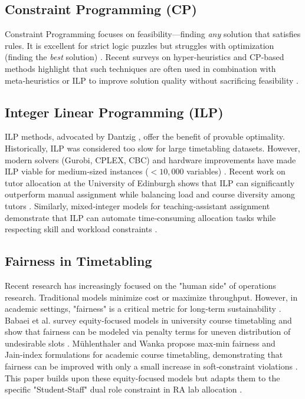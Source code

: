 \documentclass[journal,onecolumn]{IEEEtran}
\begin{document}
\subsection{Constraint Programming (CP)}
Constraint Programming focuses on feasibility—finding \textit{any} solution that satisfies rules. It is excellent for strict logic puzzles but struggles with optimization (finding the \textit{best} solution) \cite{rossi2006}. Recent surveys on hyper‑heuristics and CP‑based methods highlight that such techniques are often used in combination with meta‑heuristics or ILP to improve solution quality without sacrificing feasibility \cite{burke2010, or_human}.

\subsection{Integer Linear Programming (ILP)}
ILP methods, advocated by Dantzig \cite{dantzig}, offer the benefit of provable optimality. Historically, ILP was considered too slow for large timetabling datasets. However, modern solvers (Gurobi, CPLEX, CBC) and hardware improvements have made ILP viable for medium‑sized instances ($<10,000$ variables) \cite{cplex, gurobi, coinor}. Recent work on tutor allocation at the University of Edinburgh shows that ILP can significantly outperform manual assignment while balancing load and course diversity among tutors \cite{caselli2022, caselli2020}. Similarly, mixed‑integer models for teaching‑assistant assignment demonstrate that ILP can automate time‑consuming allocation tasks while respecting skill and workload constraints \cite{teaching_assistant_assignment, mixed_integer_tutor}.

\subsection{Fairness in Timetabling}
Recent research has increasingly focused on the "human side" of operations research. Traditional models minimize cost or maximize throughput. However, in academic settings, "fairness" is a critical metric for long‑term sustainability \cite{fairness_ml, fair_allocation}. Babaei et al. survey equity‑focused models in university course timetabling and show that fairness can be modeled via penalty terms for uneven distribution of undesirable slots \cite{babaei2015}. Mühlenthaler and Wanka propose max‑min fairness and Jain‑index formulations for academic course timetabling, demonstrating that fairness can be improved with only a small increase in soft‑constraint violations \cite{muhlen2013}. This paper builds upon these equity‑focused models but adapts them to the specific "Student‑Staff" dual role constraint in RA lab allocation \cite{edu_or, fair_allocation}.
\end{document}
